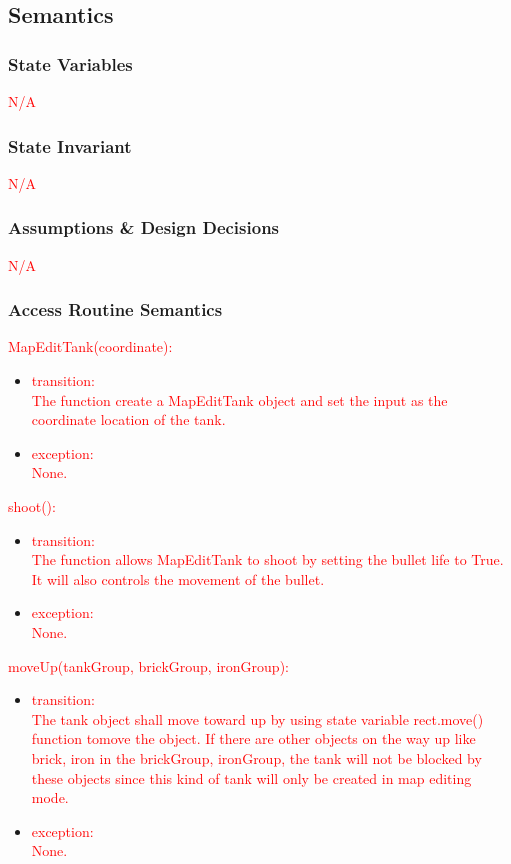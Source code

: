 \documentclass[12pt, titlepage]{article}
\begin{document}
		\subsection{Semantics}
		
		\subsubsection{State Variables}
		\textcolor{red}{N/A}
		\subsubsection{State Invariant}
		\textcolor{red}{N/A}
		
		\subsubsection{Assumptions \& Design Decisions}
		\textcolor{red}{N/A}
		\subsubsection{Access Routine Semantics}
        \textcolor{red}{MapEditTank(coordinate):}
	    \begin{itemize}
	    \item \textcolor{red}{transition:}\\
	    \textcolor{red}{The function create a MapEditTank object and set the input as the coordinate location of the tank.}\\
	    
	    \item \textcolor{red}{exception:\\ None.}
	    \end{itemize}
	    
	    
	    \textcolor{red}{shoot():}
	    \begin{itemize}
	    \item \textcolor{red}{transition:}\\
	    \textcolor{red}{The function allows MapEditTank to shoot by setting the bullet life to True. It will also controls the movement of the bullet.\\}
	    
	    \item \textcolor{red}{exception:\\ None.}
	    \end{itemize}
	    
	    
	    \textcolor{red}{moveUp(tankGroup, brickGroup, ironGroup):}
	    \begin{itemize}
	    \item \textcolor{red}{transition:}\\
	    \textcolor{red}{The tank object shall move toward up by using state variable rect.move() function tomove the object. If there are other objects on the way up like brick, iron in the brickGroup, ironGroup, the tank will not be blocked by these objects since this kind of tank will only be created in map editing mode.\\}
	    
	    \item \textcolor{red}{exception:\\ None.}
	    \end{itemize}
	    
\end{document}
